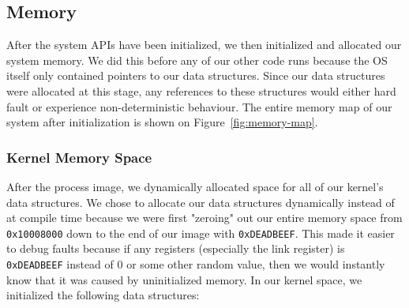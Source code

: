 \documentclass[se]{uw-wkrpt}
\begin{document}
\subsection{Memory}
After the system APIs have been initialized, we then initialized and allocated our system memory. We did this before any of our other code runs because the OS itself only contained pointers to our data structures. Since our data structures were allocated at this stage, any references to these structures would either hard fault or experience non-deterministic behaviour. The entire memory map of our system after initialization is shown on Figure~\ref{fig:memory-map}. 

\subsubsection{Kernel Memory Space}

After the process image, we dynamically allocated space for all of our kernel's data structures. We chose to allocate our data structures dynamically instead of at compile time because we were first "zeroing" out our entire memory space from \texttt{0x10008000} down to the end of our image with \texttt{0xDEADBEEF}. This made it easier to debug faults because if any registers (especially the link register) is \texttt{0xDEADBEEF} instead of 0 or some other random value, then we would instantly know that it was caused by uninitialized memory. In our kernel space, we initialized the following data structures:
\end{document}
